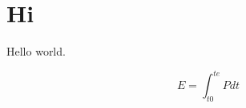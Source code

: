 \documentclass{report}
\begin{document}
\chapter{Hi}
\pagestyle{empty}
  Hello world.
  
  	
 	\[
  	E = \int_{t0}^{te} Pdt
  	\]
\end{document}
